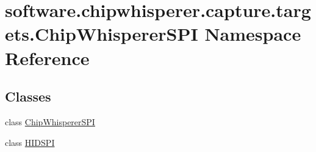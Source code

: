 \hypertarget{namespacesoftware_1_1chipwhisperer_1_1capture_1_1targets_1_1ChipWhispererSPI}{}\section{software.\+chipwhisperer.\+capture.\+targets.\+Chip\+Whisperer\+S\+P\+I Namespace Reference}
\label{namespacesoftware_1_1chipwhisperer_1_1capture_1_1targets_1_1ChipWhispererSPI}
\subsection*{Classes}
\begin{DoxyCompactItemize}
\item 
class \hyperlink{classsoftware_1_1chipwhisperer_1_1capture_1_1targets_1_1ChipWhispererSPI_1_1ChipWhispererSPI}{Chip\+Whisperer\+S\+P\+I}
\item 
class \hyperlink{classsoftware_1_1chipwhisperer_1_1capture_1_1targets_1_1ChipWhispererSPI_1_1HIDSPI}{H\+I\+D\+S\+P\+I}
\end{DoxyCompactItemize}
